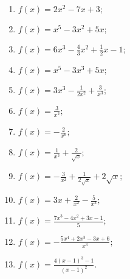 \documentclass[12pt]{article}
\begin{document}
\begin{enumerate}
    \item $f(x) = 2x^2 -7x + 3;$
    \item $f(x) = x^5 - 3x^2 + 5x;$
    \item $f(x) = 6x^3 - \frac{4}{3}x^2 + \frac{1}{2}x-1;$
    \item $f(x) = x^5 -3x^{3}+ 5x;$
    \item $f(x) = 3x^{3}-\frac{1}{2x^2} + \frac{3}{x^3};$
    \item $f(x) = \frac{3}{x^2};$
    \item $f(x) = -\frac{2}{x^6};$
    \item $f(x) = \frac{1}{x^2} + \frac{2}{\sqrt{x}};$
    \item $f(x) = -\frac{3}{x^2} + \frac{1}{2\sqrt{x}} + 2\sqrt{x};$
    \item $f(x) = 3x + \frac{2}{x^2} - \frac{5}{x^3};$
    \item $f(x) = \frac{7x^3 - 4x^2 + 3x - 1}{5};$
    \item $f(x) = -\frac{5x^4 + 2x^3 - 3x + 6}{x^3};$
    \item $f(x)=\frac{4(x-1)^{3}-1}{(x-1)^{2}}.$
\end{enumerate}
\end{document}
